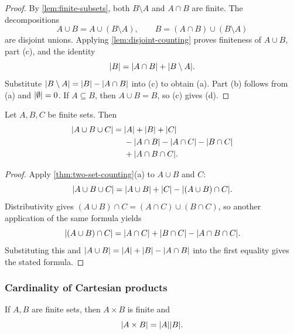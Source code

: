 \documentclass[11pt,a4paper]{amsart}
\begin{document}
\begin{proof}
  By \cref{lem:finite-subsets}, both \(B\setminus A\) and
  \(A\cap B\) are finite. The decompositions
  \[
    A\cup B=A\cup(B\setminus A),\qquad
    B=(A\cap B)\cup(B\setminus A)
  \]
  are disjoint unions. Applying \cref{lem:disjoint-counting} proves
  finiteness of \(A\cup B\), part (c), and the identity
  \[
    \lvert B\rvert=\lvert A\cap B\rvert+\lvert B\setminus A\rvert.
  \]
  Substitute \(\lvert B\setminus A\rvert=\lvert B\rvert-\lvert A\cap B\rvert\) into
  (c) to obtain (a). Part (b) follows from (a) and
  \(\lvert\emptyset\rvert=0\). If \(A\subseteq B\), then \(A\cup B=B\),
  so (c) gives (d).
\end{proof}

\begin{theorem}
  Let \(A,B,C\) be finite sets. Then
  \[
    \begin{aligned}
      \lvert A\cup B\cup C\rvert
      ={}&\lvert A\rvert+\lvert B\rvert+\lvert C\rvert\\
      &-\lvert A\cap B\rvert-\lvert A\cap C\rvert-\lvert B\cap C\rvert\\
      &+\lvert A\cap B\cap C\rvert.
    \end{aligned}
  \]
\end{theorem}

\begin{proof}
  Apply \cref{thm:two-set-counting}(a) to \(A\cup B\) and \(C\):
  \[
    \lvert A\cup B\cup C\rvert
    =\lvert A\cup B\rvert+\lvert C\rvert-\lvert(A\cup B)\cap C\rvert.
  \]
  Distributivity gives
  \((A\cup B)\cap C=(A\cap C)\cup(B\cap C)\), so another
  application of the same formula yields
  \[
    \lvert(A\cup B)\cap C\rvert
    =\lvert A\cap C\rvert+\lvert B\cap C\rvert-\lvert A\cap B\cap C\rvert.
  \]
  Substituting this and
  \(\lvert A\cup B\rvert=\lvert A\rvert+\lvert B\rvert-\lvert A\cap B\rvert\) into the first
  equality gives the stated formula.
\end{proof}

\subsubsection{Cardinality of Cartesian products}

\begin{theorem}\label{thm:finite-product-counting}
  If \(A,B\) are finite sets, then \(A\times B\) is finite and
  \[
    \lvert A\times B\rvert=\lvert A\rvert\lvert B\rvert.
  \]
\end{theorem}
\end{document}
